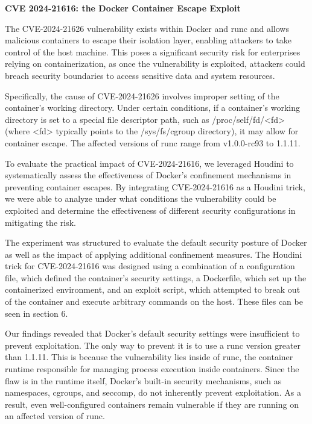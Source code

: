 \noindent\textbf{CVE 2024-21616: the Docker Container Escape Exploit}


The CVE-2024-21626 vulnerability exists within Docker and runc and allows malicious containers to escape their isolation layer, enabling attackers to take control of the host machine. This poses a significant security risk for enterprises relying on containerization, as once the vulnerability is exploited, attackers could breach security boundaries to access sensitive data and system resources. 

Specifically, the cause of CVE-2024-21626 involves improper setting of the container’s working directory. Under certain conditions, if a container's working directory is set to a special file descriptor path, such as /proc/self/fd/<fd> (where <fd> typically points to the /sys/fs/cgroup directory), it may allow for container escape. The affected versions of runc range from v1.0.0-rc93 to 1.1.11.

To evaluate the practical impact of CVE-2024-21616, we leveraged Houdini to systematically assess the effectiveness of Docker’s confinement mechanisms in preventing container escapes. By integrating CVE-2024-21616 as a Houdini trick, we were able to analyze under what conditions the vulnerability could be exploited and determine the effectiveness of different security configurations in mitigating the risk.

The experiment was structured to evaluate the default security posture of Docker as well as the impact of applying additional confinement measures. The Houdini trick for CVE-2024-21616 was designed using a combination of a configuration file, which defined the container’s security settings, a Dockerfile, which set up the containerized environment, and an exploit script, which attempted to break out of the container and execute arbitrary commands on the host. These files can be seen in section 6.

Our findings revealed that Docker’s default security settings were insufficient to prevent exploitation. The only way to prevent it is to use a runc version greater than 1.1.11. This is because the vulnerability lies inside of runc, the container runtime responsible for managing process execution inside containers. Since the flaw is in the runtime itself, Docker’s built-in security mechanisms, such as namespaces, cgroups, and seccomp, do not inherently prevent exploitation. As a result, even well-configured containers remain vulnerable if they are running on an affected version of runc.


